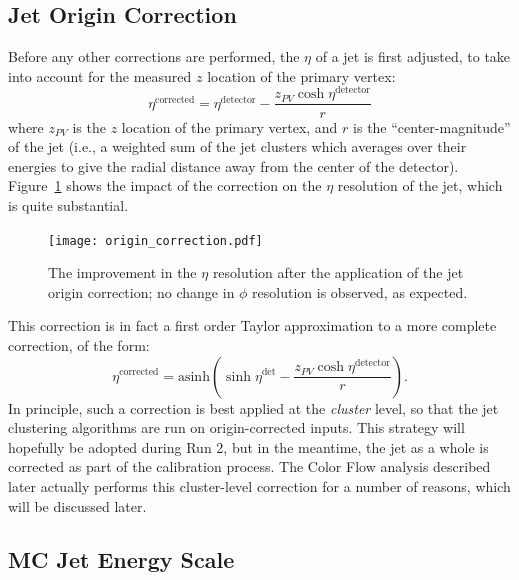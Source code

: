 

\subsection{Jet Origin Correction}

Before any other corrections are performed, the $\eta$ of a jet is first adjusted, to take into account for the measured $z$ location of the primary vertex:
%
\begin{equation}
\eta^\mathrm{corrected} = \eta^\mathrm{detector} - \frac{z_{PV} \cosh \eta^\mathrm{detector} }{r}
\end{equation}
%
where $z_{PV}$ is the $z$ location of the primary vertex, and $r$ is the ``center-magnitude'' of the jet (i.e., a weighted sum of the jet clusters which averages over their energies to give the radial distance away from the center of the detector). Figure~\ref{fig:jet-reconstruction:origin_correction} shows the impact of the correction on the $\eta$ resolution of the jet, which is quite substantial.


\begin{figure}
\centering
\texttt{[image: origin\_correction.pdf]}
\label{fig:jet-reconstruction:origin_correction}
\caption{The improvement in the $\eta$ resolution after the application of the jet origin correction; no change in $\phi$ resolution is observed, as expected.}
\end{figure}


This correction is in fact a first order Taylor approximation to a more complete correction, of the form:
%
\begin{equation}
\eta^\mathrm{corrected} = \mathrm{asinh} \left(\sinh \eta^\mathrm{det} - \frac{z_{PV} \cosh \eta^\mathrm{detector}}{r}  \right).
\end{equation}
%
In principle, such a correction is best applied at the \textit{cluster} level, so that the jet clustering algorithms are run on origin-corrected inputs. This strategy will hopefully be adopted during Run 2, but in the meantime, the jet as a whole is corrected as part of the calibration process. The Color Flow analysis described later actually performs this cluster-level correction for a number of reasons, which will be discussed later.


\subsection{MC Jet Energy Scale}
\label{jet-reconstruction:jet-calibration-mc-jet-energy-scale}

